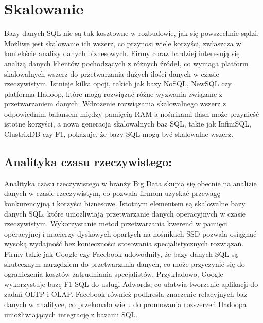\documentclass[letterpaper,10pt,polish]{sphinxmanual}
\begin{document}
\sphinxstepscope


\chapter{Skalowanie}
\label{\detokenize{rozdzialy/rozdzial4:skalowanie}}\label{\detokenize{rozdzialy/rozdzial4::doc}}
\sphinxAtStartPar
Bazy danych SQL nie są tak kosztowne w rozbudowie, jak się powszechnie sądzi. Możliwe jest skalowanie ich wszerz, co przynosi wiele korzyści, zwłaszcza w kontekście analizy danych biznesowych. Firmy coraz bardziej interesują się analizą danych klientów pochodzących z różnych źródeł, co wymaga platform skalowalnych wszerz do przetwarzania dużych ilości danych w czasie rzeczywistym. Istnieje kilka opcji, takich jak bazy NoSQL, NewSQL czy platforma Hadoop, które mogą rozwiązać różne wyzwania związane z przetwarzaniem danych. Wdrożenie rozwiązania skalowalnego wszerz z odpowiednim balansem między pamięcią RAM a nośnikami flash może przynieść istotne korzyści, a nowa generacja skalowalnych baz SQL, takie jak InfiniSQL, ClustrixDB czy F1, pokazuje, że bazy SQL mogą być skalowalne wszerz.


\section{Analityka czasu rzeczywistego:}
\label{\detokenize{rozdzialy/rozdzial4:analityka-czasu-rzeczywistego}}
\sphinxAtStartPar
Analityka czasu rzeczywistego w branży Big Data skupia się obecnie na analizie danych w czasie rzeczywistym, co pozwala firmom uzyskać przewagę konkurencyjną i korzyści biznesowe. Istotnym elementem są skalowalne bazy danych SQL, które umożliwiają przetwarzanie danych operacyjnych w czasie rzeczywistym. Wykorzystanie metod przetwarzania kwerend w pamięci operacyjnej i macierzy dyskowych opartych na nośnikach SSD pozwala osiągnąć wysoką wydajność bez konieczności stosowania specjalistycznych rozwiązań. Firmy takie jak Google czy Facebook udowodniły, że bazy danych SQL są skutecznym narzędziem do przetwarzania danych, co może przyczynić się do ograniczenia kosztów zatrudniania specjalistów. Przykładowo, Google wykorzystuje bazę F1 SQL do usługi Adwords, co ułatwia tworzenie aplikacji do zadań OLTP i OLAP. Facebook również podkreśla znaczenie relacyjnych baz danych w analityce, co przekonało wielu do promowania rozszerzeń Hadoopa umożliwiających integrację z bazami SQL.
\end{document}
